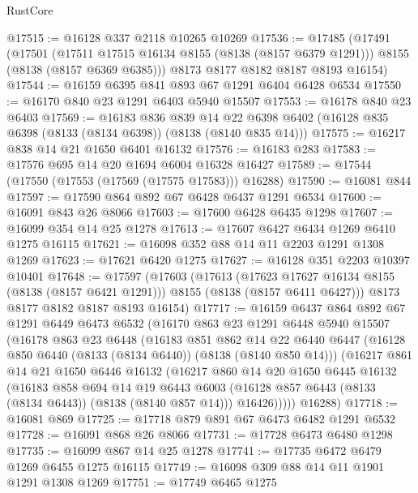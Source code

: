\begin{lexlean}{RustCore}
\begin{coremodule}
@17515 := @16128 @337 @2118 @10265 @10269
@17536 := @17485
    (@17491
      (@17501
        (@17511 @17515 @16134 @8155 (@8138 (@8157 @6379 @1291)))
        @8155
        (@8138 (@8157 @6369 @6385)))
      @8173
      @8177
      @8182
      @8187
      @8193
      @16154)
@17544 := @16159 @6395 @841 @893 @67 @1291 @6404 @6428 @6534
@17550 := @16170 @840 @23 @1291 @6403 @5940 @15507
@17553 := @16178 @840 @23 @6403
@17569 := @16183
    @836
    @839
    @14
    @22
    @6398
    @6402
    (@16128 @835 @6398 (@8133 (@8134 @6398)) (@8138 (@8140 @835 @14)))
@17575 := @16217 @838 @14 @21 @1650 @6401 @16132
@17576 := @16183 @283
@17583 := @17576 @695 @14 @20 @1694 @6004 @16328 @16427
@17589 := @17544 (@17550 (@17553 (@17569 (@17575 @17583))) @16288)
@17590 := @16081 @844
@17597 := @17590 @864 @892 @67 @6428 @6437 @1291 @6534
@17600 := @16091 @843 @26 @8066
@17603 := @17600 @6428 @6435 @1298
@17607 := @16099 @354 @14 @25 @1278
@17613 := @17607 @6427 @6434 @1269 @6410 @1275 @16115
@17621 := @16098 @352 @88 @14 @11 @2203 @1291 @1308 @1269
@17623 := @17621 @6420 @1275
@17627 := @16128 @351 @2203 @10397 @10401
@17648 := @17597
    (@17603
      (@17613
        (@17623 @17627 @16134 @8155 (@8138 (@8157 @6421 @1291)))
        @8155
        (@8138 (@8157 @6411 @6427)))
      @8173
      @8177
      @8182
      @8187
      @8193
      @16154)
@17717 := @16159
    @6437
    @864
    @892
    @67
    @1291
    @6449
    @6473
    @6532
    (@16170
      @863
      @23
      @1291
      @6448
      @5940
      @15507
      (@16178
        @863
        @23
        @6448
        (@16183
          @851
          @862
          @14
          @22
          @6440
          @6447
          (@16128 @850 @6440 (@8133 (@8134 @6440)) (@8138 (@8140 @850 @14)))
          (@16217
            @861
            @14
            @21
            @1650
            @6446
            @16132
            (@16217
              @860
              @14
              @20
              @1650
              @6445
              @16132
              (@16183
                @858
                @694
                @14
                @19
                @6443
                @6003
                (@16128 @857 @6443 (@8133 (@8134 @6443)) (@8138 (@8140 @857 @14)))
                @16426)))))
      @16288)
@17718 := @16081 @869
@17725 := @17718 @879 @891 @67 @6473 @6482 @1291 @6532
@17728 := @16091 @868 @26 @8066
@17731 := @17728 @6473 @6480 @1298
@17735 := @16099 @867 @14 @25 @1278
@17741 := @17735 @6472 @6479 @1269 @6455 @1275 @16115
@17749 := @16098 @309 @88 @14 @11 @1901 @1291 @1308 @1269
@17751 := @17749 @6465 @1275

\end{coremodule}
\end{lexlean}
